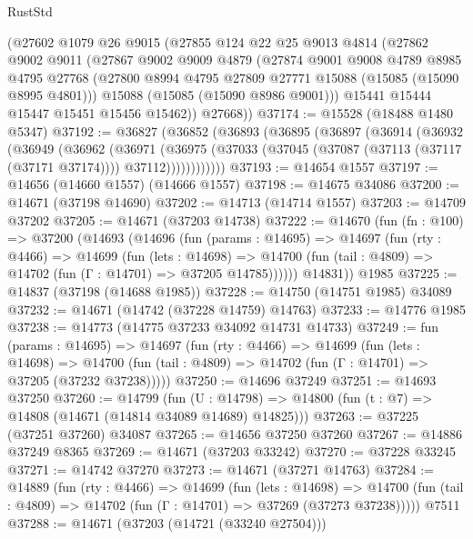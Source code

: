 \begin{lexlean}{RustStd}
\begin{coremodule}
    (@27602
      @1079
      @26
      @9015
      (@27855
        @124
        @22
        @25
        @9013
        @4814
        (@27862
          @9002
          @9011
          (@27867
            @9002
            @9009
            @4879
            (@27874
              @9001
              @9008
              @4789
              @8985
              @4795
              @27768
              (@27800 @8994 @4795 @27809 @27771 @15088 (@15085 (@15090 @8995 @4801)))
              @15088
              (@15085 (@15090 @8986 @9001)))
            @15441
            @15444
            @15447
            @15451
            @15456
            @15462))
        @27668))
@37174 := @15528 (@18488 @1480 @5347)
@37192 := @36827
    (@36852
      (@36893
        (@36895
          (@36897
            (@36914
              (@36932
                (@36949
                  (@36962
                    (@36971
                      (@36975
                        (@37033
                          (@37045 (@37087 (@37113 (@37117 (@37171 @37174)))) @37112))))))))))))
@37193 := @14654 @1557
@37197 := @14656 (@14660 @1557) (@14666 @1557)
@37198 := @14675 @34086
@37200 := @14671 (@37198 @14690)
@37202 := @14713 (@14714 @1557)
@37203 := @14709 @37202
@37205 := @14671 (@37203 @14738)
@37222 := @14670
    (fun (fn : @100) =>
    @37200
      (@14693
        (@14696
          (fun (params : @14695) =>
          @14697
            (fun (rty : @4466) =>
            @14699
              (fun (lets : @14698) =>
              @14700 (fun (tail : @4809) => @14702 (fun (Γ : @14701) => @37205 @14785))))))
        @14831))
    @1985
@37225 := @14837 (@37198 (@14688 @1985))
@37228 := @14750 (@14751 @1985) @34089
@37232 := @14671 (@14742 (@37228 @14759) @14763)
@37233 := @14776 @1985
@37238 := @14773 (@14775 @37233 @34092 @14731 @14733)
@37249 := fun (params : @14695) =>
  @14697
    (fun (rty : @4466) =>
    @14699
      (fun (lets : @14698) =>
      @14700 (fun (tail : @4809) => @14702 (fun (Γ : @14701) => @37205 (@37232 @37238)))))
@37250 := @14696 @37249
@37251 := @14693 @37250
@37260 := @14799
    (fun (U : @14798) => @14800 (fun (t : @7) => @14808 (@14671 (@14814 @34089 @14689) @14825)))
@37263 := @37225 (@37251 @37260) @34087
@37265 := @14656 @37250 @37260
@37267 := @14886 @37249 @8365
@37269 := @14671 (@37203 @33242)
@37270 := @37228 @33245
@37271 := @14742 @37270
@37273 := @14671 (@37271 @14763)
@37284 := @14889
    (fun (rty : @4466) =>
    @14699
      (fun (lets : @14698) =>
      @14700 (fun (tail : @4809) => @14702 (fun (Γ : @14701) => @37269 (@37273 @37238)))))
    @7511
@37288 := @14671 (@37203 (@14721 (@33240 @27504)))

\end{coremodule}
\end{lexlean}
